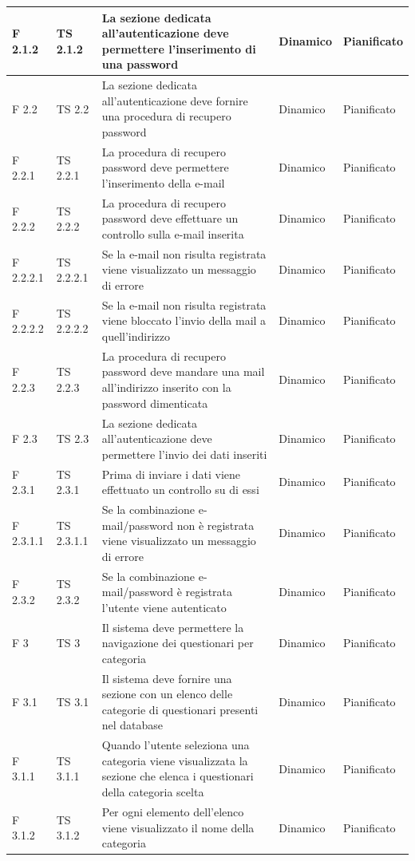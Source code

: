 \documentclass[a4paper,11pt]{article}
\begin{document}
\begin{longtable}{p{}p{}p{}p{}p{}}
\midrule
F 2.1.2 &TS 2.1.2&La sezione dedicata all'autenticazione deve permettere l'inserimento di una password & Dinamico &Pianificato\\
\midrule
F 2.2 &TS 2.2&La sezione dedicata all'autenticazione deve fornire una procedura di recupero password & Dinamico &Pianificato\\
\midrule
F 2.2.1 &TS 2.2.1&La procedura di recupero password deve permettere l'inserimento della e-mail & Dinamico &Pianificato\\
\midrule
F 2.2.2 &TS 2.2.2&La procedura di recupero password deve effettuare un controllo sulla e-mail inserita & Dinamico &Pianificato\\
\midrule
F 2.2.2.1 &TS 2.2.2.1&Se la e-mail non risulta registrata viene visualizzato un messaggio di errore & Dinamico &Pianificato\\
\midrule
F 2.2.2.2 & TS 2.2.2.2&Se la e-mail non risulta registrata viene bloccato l'invio della mail a quell'indirizzo & Dinamico &Pianificato\\
\midrule
F 2.2.3 & TS 2.2.3&La procedura di recupero password deve mandare una mail all'indirizzo inserito con la password dimenticata & Dinamico &Pianificato\\
\midrule
F 2.3 & TS 2.3&La sezione dedicata all'autenticazione deve permettere l'invio dei dati inseriti & Dinamico &Pianificato\\
\midrule
F 2.3.1 & TS 2.3.1&Prima di inviare i dati viene effettuato un controllo su di essi & Dinamico &Pianificato\\
\midrule
F 2.3.1.1 & TS 2.3.1.1 &Se la combinazione e-mail/password non è registrata viene visualizzato un messaggio di errore & Dinamico &Pianificato\\
\midrule
F 2.3.2 & TS 2.3.2 &Se la combinazione e-mail/password è registrata l'utente viene autenticato & Dinamico &Pianificato\\
\midrule
F 3 & TS 3 &Il sistema deve permettere la navigazione dei questionari per categoria & Dinamico &Pianificato\\
\midrule
F 3.1 & TS 3.1 &Il sistema deve fornire una sezione con un elenco delle categorie di questionari presenti nel database & Dinamico &Pianificato\\
\midrule
F 3.1.1 & TS 3.1.1 &Quando l'utente seleziona una categoria viene visualizzata la sezione che elenca i questionari della categoria scelta & Dinamico &Pianificato\\
\midrule
F 3.1.2 & TS 3.1.2 &Per ogni elemento dell'elenco viene visualizzato il nome della categoria & Dinamico &Pianificato\\

\end{longtable}
\end{document}
